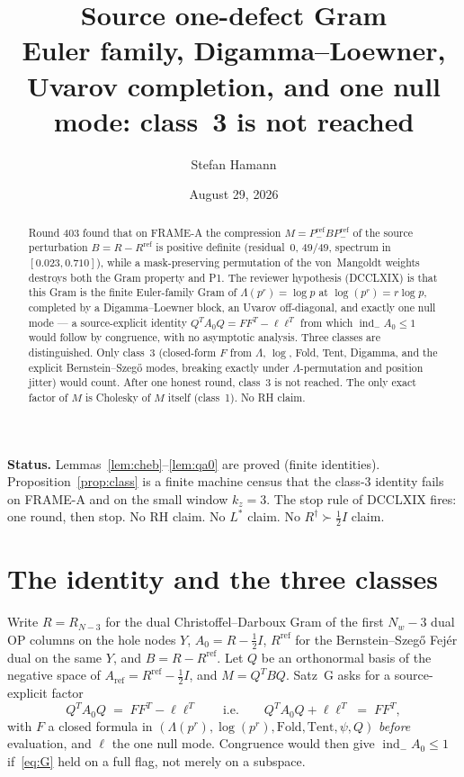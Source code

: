 \documentclass[11pt]{article}
\title{\bfseries Source one-defect Gram\\[2mm]
\large Euler family, Digamma--Loewner, Uvarov completion,
and one null mode: class~3 is not reached}
\author{Stefan Hamann}
\date{August 29, 2026}
\theoremstyle{remark}
\newcommand{\indm}{\operatorname{ind}_{-}}
\newcommand{\half}{\tfrac12}
\begin{document}
\maketitle

\begin{abstract}\noindent
Round 403 found that on FRAME-A the compression
$M=P^{\mathrm{ref}}_- B P^{\mathrm{ref}}_-$ of the source
perturbation $B=R-R^{\mathrm{ref}}$ is positive definite
(residual~$0$, $49/49$, spectrum in $[0.023,0.710]$), while a
mask-preserving permutation of the von~Mangoldt weights
destroys both the Gram property and P1.
The reviewer hypothesis (DCCLXIX) is that this Gram is the
finite Euler-family Gram of $\Lambda(p^r)=\log p$ at
$\log(p^r)=r\log p$, completed by a Digamma--Loewner block,
an Uvarov off-diagonal, and exactly one null mode --- a
source-explicit identity
$Q^T A_0 Q=FF^T-\ell\ell^T$ from which $\indm A_0\le 1$ would
follow by congruence, with no asymptotic analysis.
Three classes are distinguished.
Only class~3 (closed-form $F$ from $\Lambda$, $\log$, Fold,
Tent, Digamma, and the explicit Bernstein--Szeg\H{o} modes,
breaking exactly under $\Lambda$-permutation and position
jitter) would count.
After one honest round, class~3 is not reached.
The only exact factor of $M$ is Cholesky of $M$ itself
(class~1).
No RH claim.
\end{abstract}

\medskip\noindent
\textbf{Status.}\enspace
Lemmas~\ref{lem:cheb}--\ref{lem:qa0} are proved
(finite identities).
Proposition~\ref{prop:class} is a finite machine census that
the class-3 identity fails on FRAME-A and on the small window
$k_z=3$.
The stop rule of DCCLXIX fires: one round, then stop.
No RH claim.  No $L^*$ claim.  No $R^\dagger\succ\half I$ claim.

\section{The identity and the three classes}\label{sec:id}

Write $R=R_{N-3}$ for the dual Christoffel--Darboux Gram of
the first $N_w-3$ dual OP columns on the hole nodes $Y$,
$A_0=R-\half I$, $R^{\mathrm{ref}}$ for the Bernstein--Szeg\H{o}
Fej\'er dual on the same $Y$, and $B=R-R^{\mathrm{ref}}$.
Let $Q$ be an orthonormal basis of the negative space of
$A_{\mathrm{ref}}=R^{\mathrm{ref}}-\half I$, and
$M=Q^T B Q$.
Satz~G asks for a source-explicit factor
\begin{equation}\label{eq:G}
  Q^T A_0 Q \;=\; FF^T - \ell\ell^T
  \qquad\text{i.e.}\qquad
  Q^T A_0 Q + \ell\ell^T \;=\; FF^T,
\end{equation}
with $F$ a closed formula in $(\Lambda(p^r),\log(p^r),\mathrm{Fold},\mathrm{Tent},\psi,Q)$
\emph{before} evaluation, and $\ell$ the one null mode.
Congruence would then give $\indm A_0\le 1$ if~\eqref{eq:G}
held on a full flag, not merely on a subspace.
\end{document}
